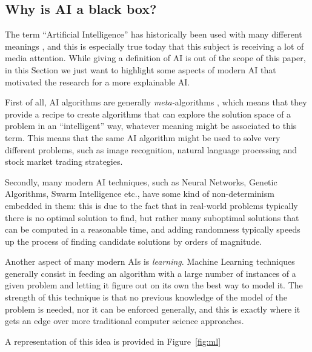 \documentclass[conference]{IEEEtran}
\newcommand{\cit}[1][]{\todo[tickmarkheight=0.2cm]{cit #1}}
\begin{document}

\subsection{Why is AI a black box?}
\label{sec:aiprog}

The term ``Artificial Intelligence'' has historically been used with many different meanings \cit, and this is especially true today that this subject is receiving a lot of media attention. While giving a definition of AI is out of the scope of this paper, in this Section we just want to highlight some aspects of modern AI that motivated the research for a more explainable AI.

First of all, AI algorithms are generally \textit{meta-}algorithms \cit, which means that they provide a recipe to create algorithms that can explore the solution space of a problem in an ``intelligent'' way, whatever meaning might be associated to this term. This means that the same AI algorithm might be used to solve very different problems, such as image recognition, natural language processing and stock market trading strategies.

Secondly, many modern AI techniques, such as Neural Networks, Genetic Algorithms, Swarm Intelligence etc., have some kind of non-determinism embedded in them: this is due to the fact that in real-world problems typically there is no optimal solution to find, but rather many suboptimal solutions that can be computed in a reasonable time, and adding randomness typically speeds up the process of finding candidate solutions by orders of magnitude.

Another aspect of many modern AIs is \textit{learning}. Machine Learning
techniques generally consist in feeding an algorithm  with a large
number of instances of a given problem and letting it figure out on its own the
best way to model it. The strength of this technique is that no previous
knowledge of the model of the problem is needed, nor it can be enforced
generally, and this is exactly where it gets an edge over more
traditional computer science approaches.

A representation of this idea is provided in Figure~\ref{fig:ml}
\end{document}
